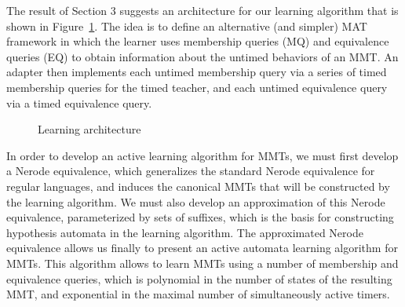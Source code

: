 The result of Section 3 suggests an architecture for our learning algorithm that is shown in Figure~\ref{architecture}.
The idea is to define an alternative (and simpler) MAT framework in which the learner uses membership queries (MQ) and equivalence queries (EQ)
to obtain information about the untimed behaviors of an MMT.
An adapter then implements each untimed membership query via a series of timed membership queries for the timed teacher,
and each untimed equivalence query via a timed equivalence query.
\begin{figure}[h]
\begin{center}
\end{center}
\caption{Learning architecture}
\label{architecture}
\end{figure}

In order to develop an active learning algorithm for MMTs, we must first develop
a Nerode equivalence, which generalizes the standard Nerode equivalence for
regular languages, and induces the canonical MMTs that will be constructed
by the learning algorithm. 
We must also develop an approximation of this Nerode equivalence,
parameterized by sets of suffixes, which is the basis for constructing
hypothesis automata in the learning algorithm. The approximated Nerode
equivalence allows us finally to present an active automata learning
algorithm for MMTs. This algorithm allows to learn MMTs using a number
of membership and equivalence queries, which is polynomial in the number of
states of the resulting MMT, and exponential in the maximal number of
simultaneously active timers.

